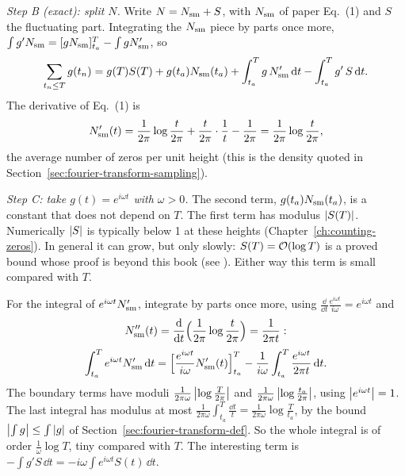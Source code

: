\emph{Step B (exact): split $N$.} Write $N=N_{\rm sm}+S$, with $N_{\rm sm}$ of paper Eq.~(1) and $S$ the fluctuating part. Integrating the $N_{\rm sm}$ piece by parts once more, $\int g'N_{\rm sm}=[gN_{\rm sm}]_{t_a}^T-\int gN_{\rm sm}'$, so
\begin{equation}
\sum_{t_n\le T}g(t_n)=g(T)S(T)+g(t_a)N_{\rm sm}(t_a)+\int_{t_a}^{T}g\,N'_{\rm sm}\,\mathrm{d} t-\int_{t_a}^{T}g'\,S\,\mathrm{d} t .
\end{equation}
The derivative of Eq.~(1) is
\[N'_{\rm sm}(t)=\frac{1}{2\pi}\log\frac{t}{2\pi}+\frac{t}{2\pi}\cdot\frac1t-\frac1{2\pi}=\frac{1}{2\pi}\log\frac{t}{2\pi},\]
the average number of zeros per unit height (this is the density quoted in Section~\ref{sec:fourier-transform-sampling}).

\emph{Step C: take $g(t)=e^{i\omega t}$ with $\omega>0$.} The second term, $g(t_a)N_{\rm sm}(t_a)$, is a constant that does not depend on $T$. The first term has modulus $\left\lvert S(T)\right\rvert$. Numerically $\left\lvert S\right\rvert$ is typically below 1 at these heights (Chapter~\ref{ch:counting-zeros}). In general it can grow, but only slowly: $S(T)=\mathcal{O}(\log T)$ is a proved bound whose proof is beyond this book (see \cite{titchmarsh}). Either way this term is small compared with $T$.

For the integral of $e^{i\omega t}N'_{\rm sm}$, integrate by parts once more, using $\frac{\dd}{\dd t}\frac{e^{i\omega t}}{i\omega}=e^{i\omega t}$ and
\[N''_{\rm sm}(t)=\frac{\mathrm{d}}{\mathrm{d} t}\Bigl(\frac{1}{2\pi}\log\frac{t}{2\pi}\Bigr)=\frac{1}{2\pi t}:\]
\[\int_{t_a}^{T}e^{i\omega t}N'_{\rm sm}\,\mathrm{d} t=\Bigl[\frac{e^{i\omega t}}{i\omega}N'_{\rm sm}(t)\Bigr]_{t_a}^{T}-\frac{1}{i\omega}\int_{t_a}^{T}\frac{e^{i\omega t}}{2\pi t}\,\mathrm{d} t .\]
The boundary terms have moduli $\frac{1}{2\pi\omega}\left\lvert \log\frac{T}{2\pi}\right\rvert$ and $\frac{1}{2\pi\omega}\left\lvert \log\frac{t_a}{2\pi}\right\rvert$, using $\left\lvert e^{i\omega t}\right\rvert=1$. The last integral has modulus at most $\frac{1}{2\pi\omega}\int_{t_a}^{T}\frac{\dd t}{t}=\frac{1}{2\pi\omega}\log\frac{T}{t_a}$, by the bound $\left\lvert \int g\right\rvert\le\int\left\lvert g\right\rvert$ of Section~\ref{sec:fourier-transform-def}. So the whole integral is of order $\frac{1}{\omega}\log T$, tiny compared with $T$. The interesting term is $-\int g'S\,\dd t=-i\omega\int e^{i\omega t}S(t)\,\dd t$.


